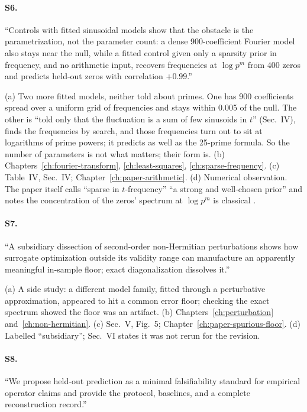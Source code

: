 \paragraph{S6.} ``Controls with fitted sinusoidal models show that the obstacle is the parametrization, not the parameter count: a dense 900-coefficient Fourier model also stays near the null, while a fitted control given only a sparsity prior in frequency, and no arithmetic input, recovers frequencies at $\log p^m$ from 400 zeros and predicts held-out zeros with correlation $+0.99$.''

(a) Two more fitted models, neither told about primes. One has 900 coefficients spread over a uniform grid of frequencies and stays within 0.005 of the null. The other is ``told only that the fluctuation is a sum of few sinusoids in $t$'' (Sec.~IV), finds the frequencies by search, and those frequencies turn out to sit at logarithms of prime powers; it predicts as well as the 25-prime formula. So the number of parameters is not what matters; their form is. (b) Chapters~\ref{ch:fourier-transform}, \ref{ch:least-squares}, \ref{ch:sparse-frequency}. (c) Table~IV, Sec.~IV; Chapter~\ref{ch:paper-arithmetic}. (d) Numerical observation. The paper itself calls ``sparse in $t$-frequency'' ``a strong and well-chosen prior'' and notes the concentration of the zeros' spectrum at $\log p^m$ is classical \cite{landau,gonek}.

\paragraph{S7.} ``A subsidiary dissection of second-order non-Hermitian perturbations shows how surrogate optimization outside its validity range can manufacture an apparently meaningful in-sample floor; exact diagonalization dissolves it.''

(a) A side study: a different model family, fitted through a perturbative approximation, appeared to hit a common error floor; checking the exact spectrum showed the floor was an artifact. (b) Chapters~\ref{ch:perturbation} and~\ref{ch:non-hermitian}. (c) Sec.~V, Fig.~5; Chapter~\ref{ch:paper-spurious-floor}. (d) Labelled ``subsidiary''; Sec.~VI states it was not rerun for the revision.

\paragraph{S8.} ``We propose held-out prediction as a minimal falsifiability standard for empirical operator claims and provide the protocol, baselines, and a complete reconstruction record.''


